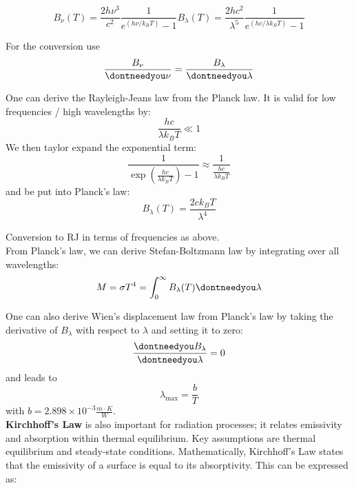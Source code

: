 \documentclass[12pt, a4paper]{article} %
\let\d\dontneedyou
\DeclareMathOperator{\d}{d}
\newcommand{\para}[1]{\left({#1}\right)}
\begin{document}
\begin{subequations}
\begin{equation}
	B_\nu(T) = \frac{2h\nu^3}{c^2} \frac{1}{e^{(h\nu/k_BT)}-1}
\end{equation}
\begin{equation}
	B_\lambda(T) = \frac{2hc^2}{\lambda^5} \frac{1}{e^{(hc/\lambda k_BT)}-1}
\end{equation}
\end{subequations}

For the conversion use
\begin{equation}
	\frac{B_\nu}{\d \nu} = \frac{B_\lambda}{\d \lambda}
\end{equation}

One can derive the Rayleigh-Jeans law from the Planck law. It is valid for low frequencies / high wavelengths by:
\begin{equation}
	\frac{hc}{\lambda k_BT} \ll 1
\end{equation}
We then taylor expand the exponential term:
\begin{equation}
	\frac{1}{\exp\para{\frac{hc}{\lambda k_BT}} - 1} \approx \frac{1}{\frac{hc}{\lambda k_BT}}
\end{equation}
and be put into Planck's law:
\begin{equation}
	B_\lambda(T) = \frac{2ck_BT}{\lambda^4}
\end{equation}

Conversion to RJ in terms of frequencies as above. \\

From Planck's law, we can derive Stefan-Boltzmann law by integrating over all wavelengths:
\begin{equation}
	M = \sigma T^4 = \int_0^\infty B_\lambda(T) \d \lambda
\end{equation}

One can also derive Wien's displacement law from Planck's law by taking the derivative of $B_\lambda$ with respect to $\lambda$ and setting it to zero:
\begin{equation}
	\frac{\d B_\lambda}{\d \lambda} = 0
\end{equation}
and leads to
\begin{equation}
	\lambda_{\max} = \frac{b}{T}
\end{equation}
with $b = 2.898 \times 10^{-3} \frac{m\cdot K}{W}$. \\

\textbf{Kirchhoff's Law} is also important for radiation processes; it relates emissivity and absorption within thermal equilibrium. Key assumptions are thermal equilibrium and steady-state conditions. Mathematically, Kirchhoff's Law states that the emissivity of a surface is equal to its absorptivity. This can be expressed as:
\end{document}
